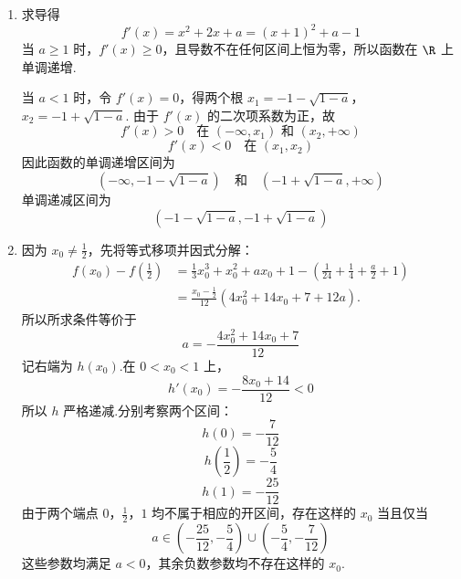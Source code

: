 \begin{solution}
\begin{enumerate}
\item 求导得
\[
f'(x)=x^2+2x+a=(x+1)^2+a-1
\]
当 \(a\geqslant1\) 时，\(f'(x)\geqslant0\)，且导数不在任何区间上恒为零，所以函数在 \(\R\) 上单调递增.

当 \(a<1\) 时，令 \(f'(x)=0\)，得两个根
\(x_1=-1-\sqrt{1-a}\)，\(x_2=-1+\sqrt{1-a}\).
由于 \(f'(x)\) 的二次项系数为正，故
\[
f'(x)>0\quad\text{在 }(-\infty,x_1)\text{ 和 }(x_2,+\infty)
\]
\[
f'(x)<0\quad\text{在 }(x_1,x_2)
\]
因此函数的单调递增区间为
\[
\left(-\infty,-1-\sqrt{1-a}\right)\quad\text{和}\quad
\left(-1+\sqrt{1-a},+\infty\right)
\]
单调递减区间为
\[
\left(-1-\sqrt{1-a},-1+\sqrt{1-a}\right)
\]

\item 因为 \(x_0\ne\frac12\)，先将等式移项并因式分解：
\[
\begin{aligned}
f(x_0)-f\left(\frac12\right)
&=\frac{1}{3}x_0^3+x_0^2+ax_0+1
 -\left(\frac{1}{24}+\frac14+\frac a2+1\right)\\
&=\frac{x_0-\frac12}{12}\left(4x_0^2+14x_0+7+12a\right).
\end{aligned}
\]
所以所求条件等价于
\[
a=-\frac{4x_0^2+14x_0+7}{12}
\]
记右端为 \(h(x_0)\).在 \(0<x_0<1\) 上，
\[
h'(x_0)=-\frac{8x_0+14}{12}<0
\]
所以 \(h\) 严格递减.分别考察两个区间：
\[
h(0)=-\frac{7}{12}
\]
\[
h\left(\frac12\right)=-\frac54
\]
\[
h(1)=-\frac{25}{12}
\]
由于两个端点 \(0\)，\(\frac12\)，\(1\) 均不属于相应的开区间，存在这样的 \(x_0\) 当且仅当
\[
a\in\left(-\frac{25}{12},-\frac54\right)\cup
\left(-\frac54,-\frac{7}{12}\right)
\]
这些参数均满足 \(a<0\)，其余负数参数均不存在这样的 \(x_0\).
\end{enumerate}
\end{solution}
